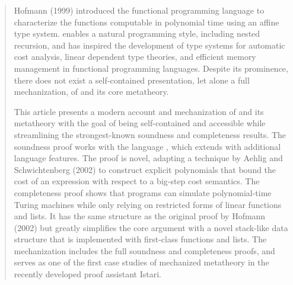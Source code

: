 \begin{abstract}
  Hofmann (1999) introduced the functional programming language \lfpl to characterize the functions computable in polynomial time using an affine type system.
  \lfpl enables a natural programming style, including nested recursion, and has inspired the development of type systems for automatic cost analysis, linear dependent type theories, and efficient memory management in functional programming languages.
  Despite its prominence, there does not exist a self-contained presentation, let alone a full mechanization, of \lfpl and its core metatheory.
  
  This article presents a modern account and mechanization of \lfpl and its metatheory with the goal of being self-contained and accessible while streamlining the strongest-known soundness and completeness results.
  The soundness proof works with the language \lfplplus, which extends \lfpl with additional language features.
  The proof is novel, adapting a technique by Aehlig and Schwichtenberg (2002) to construct explicit polynomials that bound the cost of an \lfplplus expression with respect to a big-step cost semantics.
  The completeness proof shows that \lfpl programs can simulate polynomial-time Turing machines while only relying on restricted forms of linear functions and lists.
  It has the same structure as the original proof by Hofmann (2002) but greatly simplifies the core argument with a novel stack-like data structure that is implemented with first-class functions and lists.
  The mechanization includes the full soundness and completeness proofs, and serves as one of the first case studies of mechanized metatheory in the recently developed proof assistant Istari.
\end{abstract}